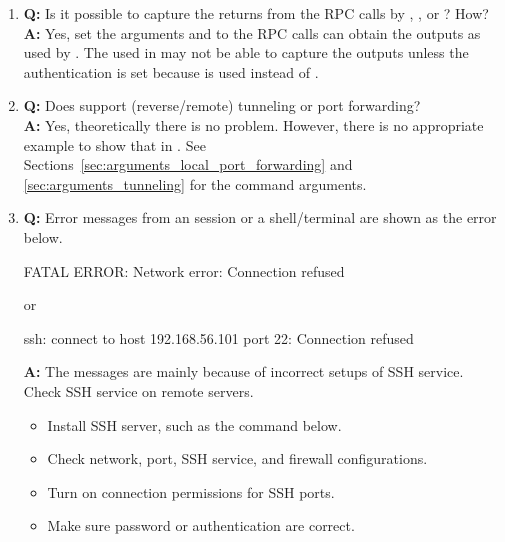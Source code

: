 \begin{enumerate}
\item {\bf\color{blue} Q:}
      Is it possible to capture the returns from the RPC calls
      by , , or ? How? \\
      {\bf\color{blue} A:}
      Yes, set the arguments  and 
      to the RPC calls can obtain the outputs as used by .
      The  used in  may not be able to capture
      the outputs unless the authentication is set because 
      is used instead of .

\item {\bf\color{blue} Q:}
      Does  support  (reverse/remote) tunneling or
      port forwarding? \\
      {\bf\color{blue} A:}
      Yes, theoretically there is no problem. However, there is no
      appropriate example to show that in .
      See Sections~\ref{sec:arguments_local_port_forwarding}
      and \ref{sec:arguments_tunneling} for the command arguments.

\item {\bf\color{blue} Q:}
      Error messages from an  session or a shell/terminal
      are shown as the error below.
\begin{Error}
FATAL ERROR: Network error: Connection refused
\end{Error}
      or
\begin{Error}
ssh: connect to host 192.168.56.101 port 22: Connection refused
\end{Error}
      {\bf\color{blue} A:}
      The messages are mainly because of incorrect setups of SSH service.
      Check SSH service on remote servers.
      \begin{itemize}
      \item Install SSH server, such as the command below.
      \item Check network, port, SSH service, and firewall configurations.
      \item Turn on connection permissions for SSH ports.
      \item Make sure password or authentication are correct.
      \end{itemize} 

\end{enumerate}

